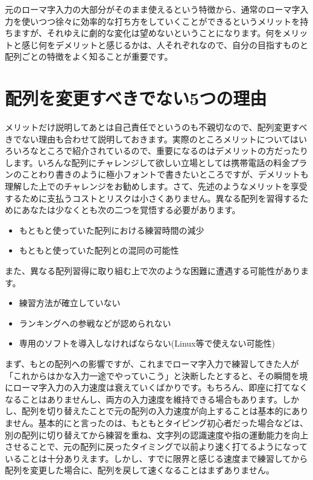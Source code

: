 元のローマ字入力の大部分がそのまま使えるという特徴から、通常のローマ字入力を使いつつ徐々に効率的な打ち方をしていくことができるというメリットを持ちますが、それゆえに劇的な変化は望めないということになります。何をメリットと感じ何をデメリットと感じるかは、人それぞれなので、自分の目指すものと配列ごとの特徴をよく知ることが重要です。

\section{配列を変更すべきでない5つの理由}

メリットだけ説明してあとは自己責任でというのも不親切なので、配列変更すべきでない理由も合わせて説明しておきます。実際のところメリットについてはいろいろなところで紹介されているので、重要になるのはデメリットの方だったりします。いろんな配列にチャレンジして欲しい立場としては携帯電話の料金プランのことわり書きのように極小フォントで書きたいところですが、デメリットも理解した上でのチャレンジをお勧めします。さて、先述のようなメリットを享受するために支払うコストとリスクは小さくありません。異なる配列を習得するためにあなたは少なくとも次の二つを覚悟する必要があります。
\begin{itemize}
 \item もともと使っていた配列における練習時間の減少
 \item もともと使っていた配列との混同の可能性
\end{itemize}
また、異なる配列習得に取り組む上で次のような困難に遭遇する可能性があります。
\begin{itemize}
 \item 練習方法が確立していない
 \item ランキングへの参戦などが認められない
 \item 専用のソフトを導入しなければならない(Linux等で使えない可能性)
\end{itemize}
まず、もとの配列への影響ですが、これまでローマ字入力で練習してきた人が「これからはかな入力一途でやっていこう」と決断したとすると、その瞬間を境にローマ字入力の入力速度は衰えていくばかりです。もちろん、即座に打てなくなることはありませんし、両方の入力速度を維持できる場合もあります。しかし、配列を切り替えたことで元の配列の入力速度が向上することは基本的にありません。基本的にと言ったのは、もともとタイピング初心者だった場合などは、別の配列に切り替えてから練習を重ね、文字列の認識速度や指の運動能力を向上させることで、元の配列に戻ったタイミングで以前より速く打てるようになっていることは十分ありえます。しかし、すでに限界と感じる速度まで練習してから配列を変更した場合に、配列を戻して速くなることはまずありません。

